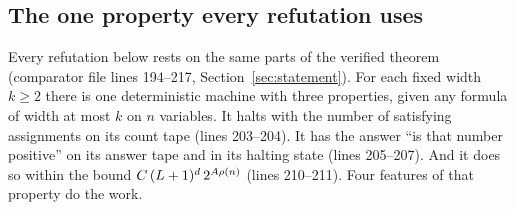 \subsection{The one property every refutation uses}
\label{sec:consequences-property}

Every refutation below rests on the same parts of the verified theorem
(comparator file lines 194--217, Section~\ref{sec:statement}). For each
fixed width $k \ge 2$ there is one deterministic machine with three
properties, given any formula of width at most $k$ on $n$ variables. It
halts with the number of satisfying assignments on its count tape (lines
203--204). It has the answer ``is that number positive'' on its answer
tape and in its halting state (lines 205--207). And it does so within the
bound $C\,(L+1)^d\,2^{A\rho(n)}$ (lines 210--211). Four features of that property do the work.

